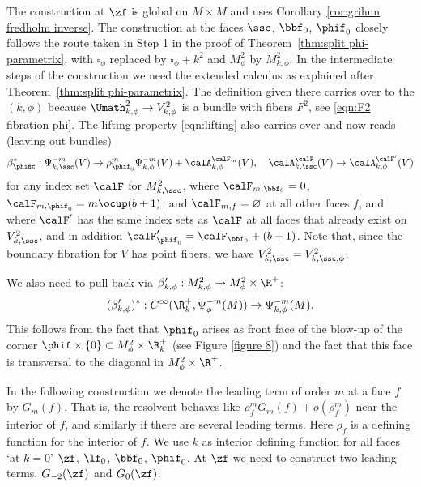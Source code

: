 The construction at $\zf$ is global on $M\times M$ and uses Corollary \ref{cor:grihun fredholm inverse}. The construction at the faces $\ssc$, $\bbf_0$, $\phif_0$ closely follows the route taken in Step 1 in the proof of Theorem~\ref{thm:split phi-parametrix}, with $\square_\phi$ replaced by $\square_\phi+k^2$ and $M^2_\phi$ by $M^2_{k,\phi}$.
In the intermediate steps of the construction we need the extended calculus as explained after Theorem~\ref{thm:split phi-parametrix}. The definition given there carries over to the $(k,\phi)$ because $\Umath^2_{k,\phi}\to V^2_{k,\phi}$ is a bundle with fibers $F^2$, see \eqref{eqn:F2 fibration phi}. The lifting property \eqref{eqn:lifting} also carries over and now reads (leaving out bundles)
\begin{equation}
\label{eqn:lifting k phi}
\beta_{\phisc}^*: \Psi_{k,\ssc}^{-m}(V) \to \rho_{\phif_0}^m\Psi_{k,\phi}^{-m}(V)+\calA_{k,\phi}^{\calF_m}(V),
\quad \calA_{k,\ssc}^{\calF}(V) \to \calA_{k,\phi}^{\calF'}(V)
\end{equation}
for any index set $\calF$ for $M^2_{k,\ssc}$,
where $\calF_{m,\bbf_0}=0$, $\calF_{m,{\phif_0}}=m \ocup (b+1)$, and
$\calF_{m,f}=\varnothing$ at all other faces $f$, and where $\calF'$ has the same index sets as
$\calF$ at all faces that already exist on $V^2_{k,\ssc}$, and in addition $\calF'_{\phif_0} = \calF_{\bbf_0}+(b+1)$. Note that, since the boundary fibration for $V$ has point fibers, we have $V^2_{k,\ssc}= V^2_{k,\ssc,\phi}$.

We also need to pull back via $\beta_{k,\phi}':M^2_{k,\phi}\to M^2_\phi \times \R^+$:
\begin{equation}
\label{eqn:lifting k phi2}
(\beta_{k,\phi}')^*: C^\infty(\R^{+}_{k},\Psi^{-m}_\phi(M)) \to \Psi^{-m}_{k,\phi}(M).
\end{equation}
This follows from the fact that $\phif_0$ arises as front face of the blow-up of the corner
$\phif\times\{0\}\subset M^2_\phi\times\R^{+}_{k}$ (see Figure \ref{figure 8}) and the fact that this face is transversal to the diagonal in $M^2_\phi\times\R^+$.

In the following construction we denote the leading term of order $m$ at a face $f$ by $G_m(f)$. That is, the resolvent behaves like $\rho_f^m G_m(f) + o(\rho_f^m)$ near the interior of $f$, and similarly if there are several leading terms. Here $\rho_f$ is a defining function for the interior of $f$. We use $k$ as interior defining function for all faces `at $k=0$' \ie $\zf$, $\lf_0$, $\bbf_0$, $\phif_0$.
At $\zf$ we need to construct two leading terms, $G_{-2}(\zf)$ and $G_0(\zf)$.

